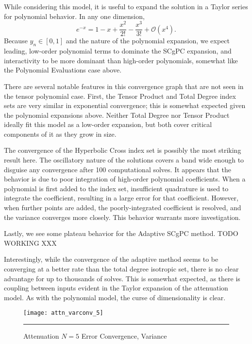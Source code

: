 While considering this model, it is useful to expand the solution in a Taylor series for polynomial behavior.
In any one dimension,
\begin{equation}
  e^{-x} = 1 - x + \frac{x^2}{2!} - \frac{x^3}{3!} + \mathcal{O}(x^4).
\end{equation}
Because $y_n\in[0,1]$ and the nature of the polynomial expansion, we expect leading, low-order polynomial
terms to dominate the SCgPC expansion, and interactivity to be more dominant than high-order polynomials,
somewhat like the Polynomial Evaluations case above.

There are several notable features in this convergence graph that are not seen in the tensor polynomial case.
First, the Tensor Product and Total Degree index sets are very similar in exponential convergence; this is
somewhat expected given the polynomial expansions above.  Neither Total Degree nor Tensor Product ideally fit
this model as a low-order expansion, but both cover critical components of it as they grow in size.

The convergence of the Hyperbolic Cross index set is possibly the most striking result here.  The oscillatory
nature of the solutions covers a band wide enough to disguise any convergence after 100 computational solves.
It appears that the behavior is due to poor integration of high-order polynomial coefficients.  When a
polynomial is first added to the index set, insufficient quadrature is used to integrate the coefficient,
resulting in a large error for that coefficient.  However, when further points are added, the
poorly-integrated coefficient is resolved, and the variance converges more closely.  This behavior warrants
more investigation.

Lastly, we see some plateau behavior for the Adaptive SCgPC method. TODO WORKING XXX



Interestingly, while the convergence of the adaptive method seems to be converging at a better rate than the
total degree isotropic set, there is no clear advantage for up to thousands of solves.  This is somewhat
expected, as there is coupling between inputs evident in the Taylor expansion of the attenuation model.  
As with the polynomial model,
the curse of dimensionality is clear.

\begin{figure}[H]
  \centering
    \texttt{[image: attn\_varconv\_5]}
    \rule{35em}{0.5pt}
  \caption{Attenuation $N=5$ Error Convergence, Variance}
  \label{fig:att5_varconv}
\end{figure}

